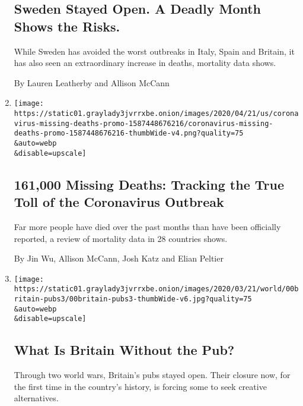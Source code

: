 \begin{enumerate}
  \hypertarget{sweden-stayed-open-a-deadly-month-shows-the-risks}{%
  \subsection{Sweden Stayed Open. A Deadly Month Shows the
  Risks.}\label{sweden-stayed-open-a-deadly-month-shows-the-risks}}

  While Sweden has avoided the worst outbreaks in Italy, Spain and
  Britain, it has also seen an extraordinary increase in deaths,
  mortality data shows.

  By Lauren Leatherby and Allison McCann
\item
  \href{/interactive/2020/04/21/world/coronavirus-missing-deaths.html}{}

  \texttt{[image: https://static01.graylady3jvrrxbe.onion/images/2020/04/21/us/coronavirus-missing-deaths-promo-1587448676216/coronavirus-missing-deaths-promo-1587448676216-thumbWide-v4.png?quality=75\\\&auto=webp\\\&disable=upscale]}

  \hypertarget{161000-missing-deaths-tracking-the-true-toll-of-the-coronavirus-outbreak}{%
  \subsection{161,000 Missing Deaths: Tracking the True Toll of the
  Coronavirus
  Outbreak}\label{161000-missing-deaths-tracking-the-true-toll-of-the-coronavirus-outbreak}}

  Far more people have died over the past months than have been
  officially reported, a review of mortality data in 28 countries shows.

  By Jin Wu, Allison McCann, Josh Katz and Elian Peltier
\item
  \href{/2020/04/09/world/europe/uk-pub-coronavirus.html}{}

  \texttt{[image: https://static01.graylady3jvrrxbe.onion/images/2020/03/21/world/00britain-pubs3/00britain-pubs3-thumbWide-v6.jpg?quality=75\\\&auto=webp\\\&disable=upscale]}

  \hypertarget{what-is-britain-without-the-pub}{%
  \subsection{What Is Britain Without the
  Pub?}\label{what-is-britain-without-the-pub}}

  Through two world wars, Britain's pubs stayed open. Their closure now,
  for the first time in the country's history, is forcing some to seek
  creative alternatives.


\end{enumerate}
